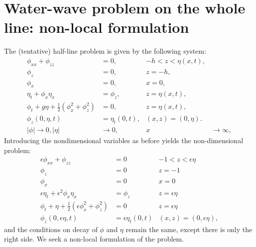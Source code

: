 \documentclass[10pt,reqno,oneside,a4paper]{article}
\begin{document}
\section{Water-wave problem on the whole line: non-local formulation}
The (tentative) half-line problem is given by the following system:
\begin{subequations}\label{DimHalfLineProblem}
\begin{align}
\phi_{xx} + \phi_{zz} &= 0, &-h < z < \eta(x,t), \\
\phi_{z} &= 0, &z = -h, \\
\phi_{x} &= 0, &x =0, \\
\eta_t + \phi_{x}\eta_{x} &= \phi_{z}, & z = \eta(x,t), \\
\phi_t + g\eta + \frac{1}{2}(\phi_{x}^2 + \phi_{z}^2) &= 0, &z = \eta(x,t), \\
\phi_{z}(0,\eta,t) &= \eta_t(0,t), &(x,z) = (0,\eta). \\
|\phi| \to 0, |\eta| &\to 0,  &x &\to \infty,
\end{align}
\end{subequations}
Introducing the nondimensional variables as before yields the non-dimensional problem:
\begin{subequations} \label{NondimHalfLineProblem}
\begin{align}
\label{NondimPDE}\epsilon\phi_{xx} + \phi_{zz} &= 0 &-1 < z < \epsilon\eta \\
\label{NondimBC1}\phi_{z} &= 0 &z = -1 \\
\label{NondimBC2}\phi_{x} &= 0 &x =0 \\
\label{NondimBC3}\epsilon\eta_t + \epsilon^2 \phi_{x}\eta_{x} &= \phi_{z} & z = \epsilon\eta\\
\label{NondimBC4}\phi_t + \eta + \frac{1}{2}(\epsilon\phi_{x}^2 + \phi_{z}^2) &= 0 &z = \epsilon\eta \\
\label{NondimBC5}\phi_{z}(0,\epsilon\eta,t) &= \epsilon\eta_t(0,t) &(x,z) = (0,\epsilon\eta),
\end{align}
\end{subequations}
and the conditions on decay of $\phi$ and $\eta$ remain the same, except there is only the right side. We seek a non-local formulation of the problem.
\end{document}
